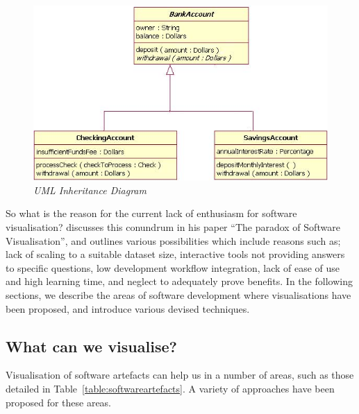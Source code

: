 \begin{figure}[!htb]
   	\centering
  	\includegraphics[scale=0.40]{uml.jpg}	
	\caption{\textit{UML Inheritance Diagram} \citep{uml}}
	\label{fig:uml}
\end{figure}

So what is the reason for the current lack of enthusiasm for software visualisation? \citet{reiss05} discusses this conundrum in his paper ``The paradox of Software Visualisation'', and outlines various possibilities which include reasons such as; lack of scaling to a suitable dataset size, interactive tools not providing answers to specific questions, low development workflow integration, lack of ease of use and high learning time, and neglect to adequately prove benefits. In the following sections, we describe the areas of software development where visualisations have been proposed, and introduce various devised techniques.

\subsection{What can we visualise?}\label{sect:whattovisualise}

Visualisation of software artefacts can help us in a number of areas, such as those detailed in Table~\vref{table:softwareartefacts}. A variety of approaches have been proposed for these areas.

